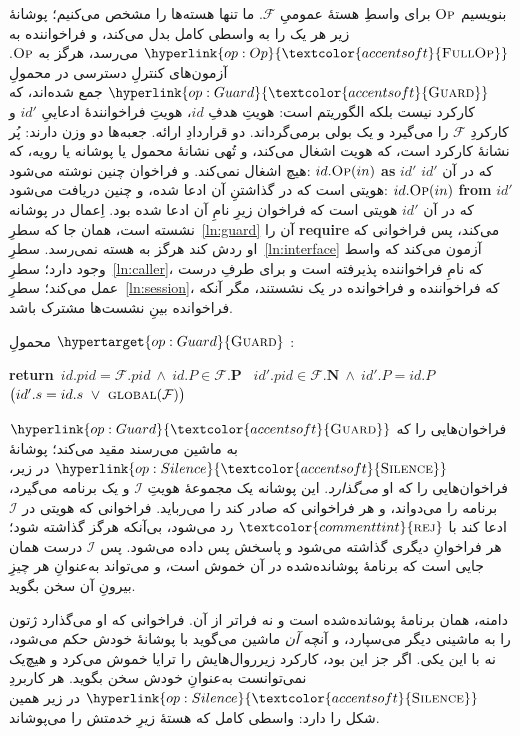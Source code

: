 \documentclass[10pt,oneside,openany]{book}
\newcommand{\Ps}{\mathbf{P}}
\newcommand{\PID}{\mathit{pid}}
\newcommand{\admits}{\mathbf{N}}
\newcommand{\F}{\mathcal{F}}
\newcommand{\op}[1]{\textnormal{\textsc{#1}}}
\newcommand{\opdef}[1]{\hypertarget{op:#1}{\op{#1}}}
\newcommand{\opl}[1]{\hyperlink{op:#1}{\textcolor{accentsoft}{\op{#1}}}}
\newcommand{\fopl}[1]{\hyperlink{op:#1}{\textcolor{accentsoft}{\op{Full}\op{#1}}}}
\newcommand{\Ids}{\mathcal{I}}
\newcommand{\id}{id}
\newcommand{\atom}[1]{\textcolor{commenttint}{\op{#1}}}
\newcommand{\rej}{\atom{rej}}
\newcommand{\Op}{\op{Op}}
\newlength{\algretwd}\settowidth{\algretwd}{\textbf{return}}
\newcommand{\algand}{\makebox[\algretwd][r]{$\wedge$\,}}
\newcommand{\opsig}[1]{\textcolor{accent}{\underline{\smash{#1}}}}
\theoremstyle{accentdef}
\theoremstyle{accentplain}
\begin{document}
بنویسیم $\Op$ برای واسطِ هستهٔ عمومیِ $\F$. ما تنها هسته‌ها را مشخص
می‌کنیم؛ پوشانهٔ زیر هر یک را به واسطی کامل بدل می‌کند، و فراخواننده به
$\fopl{Op}$ می‌رسد، هرگز به $\Op$. آزمون‌های کنترلِ دسترسی در محمولِ
$\opl{Guard}$ جمع شده‌اند، که کارکرد نیست بلکه الگوریتم است: هویتِ هدفِ
$\id$، هویتِ فراخوانندهٔ ادعاییِ $\id'$ و کارکردِ $\F$ را می‌گیرد و یک
بولی برمی‌گرداند. دو قراردادِ ارائه. جعبه‌ها دو وزن دارند: پُر نشانهٔ
کارکرد است، که هویت اشغال می‌کند، و تُهی نشانهٔ محمول یا پوشانه یا رویه،
که هیچ اشغال نمی‌کند. و فراخوان چنین نوشته می‌شود: $\id.\Op(in)$
\textbf{as} $\id'$ که در آن $\id'$ هویتی است که در گذاشتنِ آن ادعا شده، و
چنین دریافت می‌شود: $\id.\Op(in)$ \textbf{from} $\id'$ که در آن $\id'$
هویتی است که فراخوان زیرِ نامِ آن ادعا شده بود. اِعمال در پوشانه نشسته
است، همان جا که سطرِ~\ref{ln:guard} آن را \textbf{require} می‌کند، پس
فراخوانی که او ردش کند هرگز به هسته نمی‌رسد.
سطرِ~\ref{ln:interface} آزمون می‌کند که واسط وجود دارد؛
سطرِ~\ref{ln:caller}، که نامِ فراخواننده پذیرفته است و برای طرفِ درست
عمل می‌کند؛ سطرِ~\ref{ln:session}، که فراخواننده و فراخوانده در یک نشستند،
مگر آنکه فراخوانده بینِ نشست‌ها مشترک باشد.


\begin{procedure}{محمولِ $\opdef{Guard}$}
\opsig{$\opl{Guard}_{\F}\bigl(\id,\id'\bigr)$}:
\begin{algorithmic}[1]
\State \textbf{return}\  $\id.\PID = \F.\PID \ \wedge\  \id.P \in \F.\Ps$
       \label{ln:interface}
\State \algand\  $\id'.\PID \in \F.\admits \ \wedge\  \id'.P = \id.P$
       \label{ln:caller}
\State \algand\  $\bigl(\id'.s = \id.s \ \vee\ \op{global}(\F)\bigr)$
       \label{ln:session}
\end{algorithmic}
\end{procedure}

$\opl{Guard}$ فراخوان‌هایی را که به ماشین می‌رسند مقید می‌کند؛ پوشانهٔ
$\opl{Silence}$ در زیر، فراخوان‌هایی را که او \emph{می‌گذارد}. این پوشانه
یک مجموعهٔ هویتِ $\Ids$ و یک برنامه می‌گیرد، برنامه را می‌دواند، و هر
فراخوانی که صادر کند را می‌رباید. فراخوانی که هویتی در $\Ids$ ادعا کند با
$\rej$ رد می‌شود، بی‌آنکه هرگز گذاشته شود؛ هر فراخوانِ دیگری گذاشته
می‌شود و پاسخش پس داده می‌شود. پس $\Ids$ درست همان جایی است که برنامهٔ
پوشانده‌شده در آن خموش است، و می‌تواند به‌عنوانِ هر چیزِ بیرونِ آن سخن
بگوید.

دامنه، همان برنامهٔ پوشانده‌شده است و نه فراتر از آن. فراخوانی که او
می‌گذارد ژتون را به ماشینی دیگر می‌سپارد، و آنچه \emph{آن} ماشین می‌گوید
با پوشانهٔ خودش حکم می‌شود، نه با این یکی. اگر جز این بود، کارکرد
زیرروال‌هایش را ترایا خموش می‌کرد و هیچ‌یک نمی‌توانست به‌عنوانِ خودش سخن
بگوید. هر کاربردِ $\opl{Silence}$ در زیر همین شکل را دارد: واسطی کامل که
هستهٔ زیرِ خدمتش را می‌پوشاند.
\end{document}
